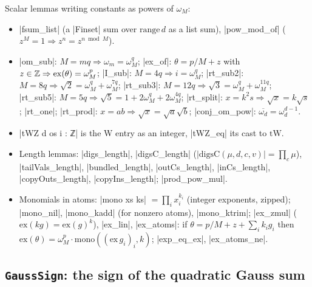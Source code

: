 Scalar lemmas writing constants as powers of $\omega_M$:
\begin{itemize}
\item \lean|fsum_list| (a \lean|Finset| sum over $\mathrm{range}\,d$ as a list sum),
  \lean|pow_mod_of| ($z^M=1\Rightarrow z^n=z^{n\bmod M}$).
\item \lean|om_sub|: $M=mq\Rightarrow\omega_m=\omega_M^q$; \lean|ex_of|: $\theta=p/M+z$ with $z\in\mathbb{Z}\Rightarrow
  \mathrm{ex}(\theta)=\omega_M^p$; \lean|I_sub|: $M=4q\Rightarrow i=\omega_M^q$;
  \lean|rt_sub2|: $M=8q\Rightarrow\sqrt2=\omega_M^q+\omega_M^{7q}$; \lean|rt_sub3|: $M=12q\Rightarrow
  \sqrt3=\omega_M^q+\omega_M^{11q}$; \lean|rt_sub5|: $M=5q\Rightarrow\sqrt5=1+2\omega_M^q+2\omega_M^{4q}$;
  \lean|rt_split|: $x=k^2s\Rightarrow\sqrt x=k\sqrt s$; \lean|rt_one|; \lean|rt_prod|:
  $x=ab\Rightarrow\sqrt x=\sqrt a\sqrt b$; \lean|conj_om_pow|: $\overline{\omega_d}=\omega_d^{d-1}$.
\item \lean|tWZ d os i : ℤ| is the W entry as an integer, \lean|tWZ_eq| its cast to $\mathrm{tW}$.
\item Length lemmas: \lean|digs_length|, \lean|digsC_length| ($|\mathrm{digsC}(\mu,d,c,v)|=\prod_c\mu$),
  \lean|tailVals_length|, \lean|bundled_length|, \lean|outCs_length|, \lean|inCs_length|,
  \lean|copyOuts_length|, \lean|copyIns_length|; \lean|prod_pow_mul|.
\item Monomials in atoms: \lean|mono xs ks| $=\prod_ix_i^{k_i}$ (integer exponents, zipped);
  \lean|mono_nil|, \lean|mono_kadd| (for nonzero atoms), \lean|mono_ktrim|; \lean|ex_zmul|
  ($\mathrm{ex}(kg)=\mathrm{ex}(g)^k$), \lean|ex_lin|, \lean|ex_atoms|: if
  $\theta=p/M+z+\sum_ik_ig_i$ then $\mathrm{ex}(\theta)=\omega_M^p\cdot\mathrm{mono}((\mathrm{ex}\,g_i)_i,k)$;
  \lean|exp_eq_ex|, \lean|ex_atoms_ne|.
\end{itemize}

\subsection{\texttt{GaussSign}: the sign of the quadratic Gauss sum}

